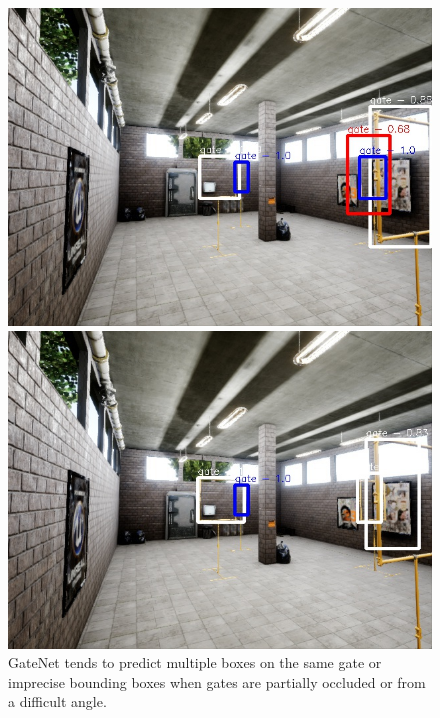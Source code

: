 \documentclass{article}
\begin{document}
\begin{figure}[h]
	\begin{minipage}{0.3\linewidth}
	\includegraphics[width=\linewidth]{fig/gate_comp4}
	\end{minipage}
	\begin{minipage}{0.3\linewidth}
	\includegraphics[width=\linewidth]{fig/v2_comp4}
	\end{minipage}
	\caption{GateNet tends to predict multiple boxes on the same gate or imprecise bounding boxes when gates are partially occluded or from a difficult angle.}


\end{figure}
\end{document}
